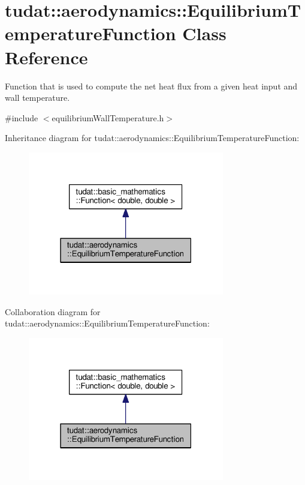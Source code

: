 \hypertarget{classtudat_1_1aerodynamics_1_1EquilibriumTemperatureFunction}{}\section{tudat\+:\+:aerodynamics\+:\+:Equilibrium\+Temperature\+Function Class Reference}
\label{classtudat_1_1aerodynamics_1_1EquilibriumTemperatureFunction}


Function that is used to compute the net heat flux from a given heat input and wall temperature.  




{\ttfamily \#include $<$equilibrium\+Wall\+Temperature.\+h$>$}



Inheritance diagram for tudat\+:\+:aerodynamics\+:\+:Equilibrium\+Temperature\+Function\+:
\nopagebreak
\begin{figure}[H]
\begin{center}
\leavevmode
\includegraphics[width=243pt]{classtudat_1_1aerodynamics_1_1EquilibriumTemperatureFunction__inherit__graph}
\end{center}
\end{figure}


Collaboration diagram for tudat\+:\+:aerodynamics\+:\+:Equilibrium\+Temperature\+Function\+:
\nopagebreak
\begin{figure}[H]
\begin{center}
\leavevmode
\includegraphics[width=243pt]{classtudat_1_1aerodynamics_1_1EquilibriumTemperatureFunction__coll__graph}
\end{center}
\end{figure}

